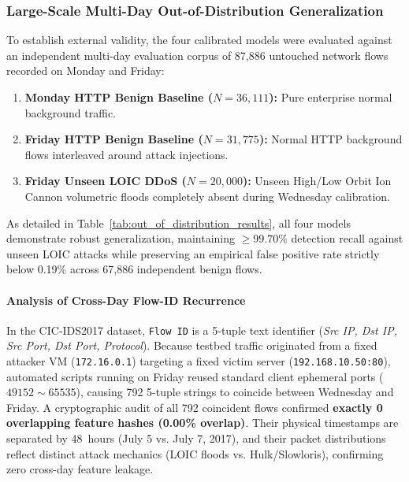 \subsubsection{Large-Scale Multi-Day Out-of-Distribution Generalization}
To establish external validity, the four calibrated models were evaluated against an independent multi-day evaluation corpus of 87,886 untouched network flows recorded on Monday and Friday:
\begin{enumerate}
    \item \textbf{Monday HTTP Benign Baseline ($N = 36,111$):} Pure enterprise normal background traffic.
    \item \textbf{Friday HTTP Benign Baseline ($N = 31,775$):} Normal HTTP background flows interleaved around attack injections.
    \item \textbf{Friday Unseen LOIC DDoS ($N = 20,000$):} Unseen High/Low Orbit Ion Cannon volumetric floods completely absent during Wednesday calibration.
\end{enumerate}

As detailed in Table~\ref{tab:out_of_distribution_results}, all four models demonstrate robust generalization, maintaining $\ge 99.70\%$ detection recall against unseen LOIC attacks while preserving an empirical false positive rate strictly below 0.19\% across 67,886 independent benign flows.

\paragraph{Analysis of Cross-Day Flow-ID Recurrence}
In the CIC-IDS2017 dataset, \texttt{Flow ID} is a 5-tuple text identifier (\textit{Src IP, Dst IP, Src Port, Dst Port, Protocol}). Because testbed traffic originated from a fixed attacker VM (\texttt{172.16.0.1}) targeting a fixed victim server (\texttt{192.168.10.50:80}), automated scripts running on Friday reused standard client ephemeral ports ($49152\sim 65535$), causing 792 5-tuple strings to coincide between Wednesday and Friday. A cryptographic audit of all 792 coincident flows confirmed \textbf{exactly 0 overlapping feature hashes (0.00\% overlap)}. Their physical timestamps are separated by 48~hours (July 5 vs. July 7, 2017), and their packet distributions reflect distinct attack mechanics (LOIC floods vs. Hulk/Slowloris), confirming zero cross-day feature leakage.

